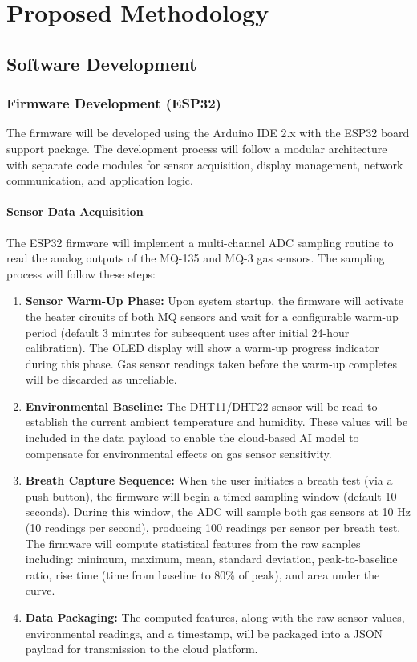 \chapter{Proposed Methodology}

\section{Software Development}

\subsection{Firmware Development (ESP32)}
The firmware will be developed using the Arduino IDE 2.x with the ESP32 board support package. The development process will follow a modular architecture with separate code modules for sensor acquisition, display management, network communication, and application logic.

\subsubsection*{Sensor Data Acquisition}
The ESP32 firmware will implement a multi-channel ADC sampling routine to read the analog outputs of the MQ-135 and MQ-3 gas sensors. The sampling process will follow these steps:

\begin{enumerate}[leftmargin=1.5cm]
\item \textbf{Sensor Warm-Up Phase:} Upon system startup, the firmware will activate the heater circuits of both MQ sensors and wait for a configurable warm-up period (default 3 minutes for subsequent uses after initial 24-hour calibration). The OLED display will show a warm-up progress indicator during this phase. Gas sensor readings taken before the warm-up completes will be discarded as unreliable.

\item \textbf{Environmental Baseline:} The DHT11/DHT22 sensor will be read to establish the current ambient temperature and humidity. These values will be included in the data payload to enable the cloud-based AI model to compensate for environmental effects on gas sensor sensitivity.

\item \textbf{Breath Capture Sequence:} When the user initiates a breath test (via a push button), the firmware will begin a timed sampling window (default 10 seconds). During this window, the ADC will sample both gas sensors at 10 Hz (10 readings per second), producing 100 readings per sensor per breath test. The firmware will compute statistical features from the raw samples including: minimum, maximum, mean, standard deviation, peak-to-baseline ratio, rise time (time from baseline to 80\% of peak), and area under the curve.

\item \textbf{Data Packaging:} The computed features, along with the raw sensor values, environmental readings, and a timestamp, will be packaged into a JSON payload for transmission to the cloud platform.
\end{enumerate}


